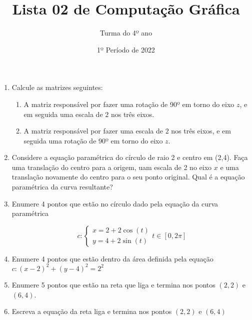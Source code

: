 \documentclass[12pt]{article}
\title{Lista 02 de Computação Gráfica}
\date{1º Período de 2022}
\author{Turma do 4º ano}
\begin{document}
\maketitle

\begin{enumerate}


\item Calcule as matrizes seguintes:

\begin{enumerate}

\item A matriz responsável por fazer uma rotação de 90º em torno do eixo $z$, e em seguida uma escala de $2$ nos três eixos.

\item A matriz responsável por fazer uma escala de $2$ nos três eixos, e em seguida uma rotação de 90º em torno do eixo $z$.

\end{enumerate}

\item Considere a equação paramétrica do círculo de raio 2 e centro em (2,4).
Faça uma translação do centro para a origem, uam escala de 2 no eixo $x$ e uma translação novamente do centro para o seu ponto original.
Qual é a equação paramétrica da curva resultante?


\item Enumere 4 pontos que estão no círculo dado pela equação da curva paramétrica

\[c:
\begin{cases}
	x=2+2\cos(t)\\
	y=4+2\sin(t)
\end{cases}
t\in \left[0, 2\pi\right]
\]


\item Enumere 4 pontos que estão dentro da área definida pela equação $c: (x-2)^2 + (y-4)^2 = 2^2$


\item Enumere 5 pontos que estão na reta que liga e termina nos pontos $(2, 2)$ e $(6, 4)$.


\item Escreva a equação da reta liga e termina nos pontos $(2, 2)$ e $(6, 4)$






\end{enumerate}
\end{document}
